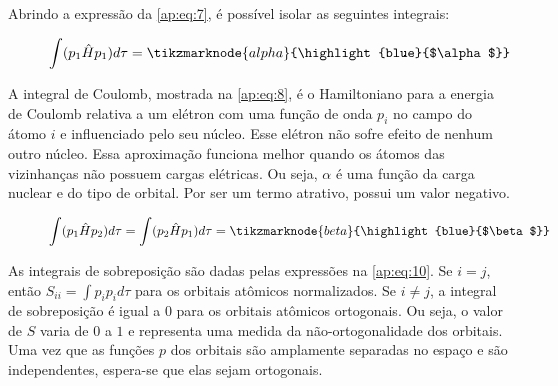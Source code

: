 Abrindo a expressão da \autoref{ap:eq:7}, é possível isolar as seguintes integrais:

\begin{figure}[htb]
    \vspace{2\baselineskip}
\begin{equation}
\label{ap:eq:8}
    \displaystyle \int (p_1 \hat{H} p_1) d\tau = \tikzmarknode{alpha}{\highlight{blue}{$\alpha$}} \\
\end{equation}
\end{figure}

A integral de Coulomb, mostrada na \autoref{ap:eq:8}, é o Hamiltoniano para a energia de Coulomb relativa a um elétron com uma função de onda $p_i$ no campo do átomo $i$ e influenciado pelo seu núcleo. Esse elétron não sofre efeito de nenhum outro núcleo. Essa aproximação funciona melhor quando os átomos das vizinhanças não possuem cargas elétricas. Ou seja, $\alpha$ é uma função da carga nuclear e do tipo de orbital. Por ser um termo atrativo, possui um valor negativo. 

\begin{figure}[htb]
    \vspace{2\baselineskip}
\begin{equation}
\label{ap:eq:9}
    \displaystyle \int (p_1 \hat{H} p_2) d\tau = \displaystyle \int (p_2 \hat{H} p_1) d\tau = \tikzmarknode{beta}{\highlight{blue}{$\beta$}}
\end{equation}
\end{figure}

As integrais de sobreposição são dadas pelas expressões na \autoref{ap:eq:10}. Se $i=j$, então $S_{ii} = \displaystyle \int p_i p_i d \tau$ para os orbitais atômicos normalizados. Se $i \neq j $, a integral de sobreposição é igual a $0$ para os orbitais atômicos ortogonais. Ou seja, o valor de $S$ varia de $0$ a $1$ e representa uma medida da não-ortogonalidade dos orbitais. Uma vez que as funções $p$ dos orbitais são amplamente separadas no espaço e são independentes, espera-se que elas sejam ortogonais.

